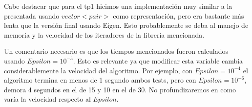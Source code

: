 
\vspace{1em}
Cabe destacar que para el tp1 hicimos una implementación muy similar a la presentada usando $vector<pair>$ como representación, pero era bastante más lenta que la versión final usando Eigen. Esto probablemente se deba al manejo de memoria y la velocidad de los iteradores de la librería mencionada.

\vspace{1em}
Un comentario necesario es que los tiempos mencionados fueron calculados usando $Epsilon = 10^{-5}$. Esto es relevante ya que modificar esta variable cambia considerablemente la velocidad del algoritmo. Por ejemplo, con $Epsilon = 10^{-4}$ el algoritmo termina en menos de 1 segundo ambos tests, pero con $Epsilon = 10^{-6}$, demora 4 segundos en el de 15 y 10 en el de 30. No profundizaremos en como varía la velocidad respecto al $Epsilon$.